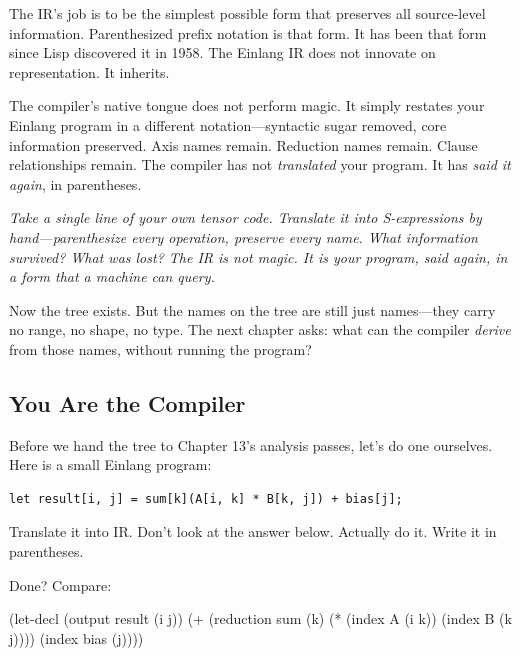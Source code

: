 \documentclass[11pt,titlepage]{article}
\newenvironment{Shaded}{}{}
\newcommand{\NormalTok}[1]{#1}
\newcommand{\OperatorTok}[1]{\textcolor[rgb]{0.40,0.40,0.40}{#1}}
\begin{document}
The IR's job is to be the simplest possible form that preserves all
source-level information. Parenthesized prefix notation is that form. It
has been that form since Lisp discovered it in 1958. The Einlang IR does
not innovate on representation. It inherits.

\vspace{2em}

The compiler's native tongue does not perform magic. It simply restates
your Einlang program in a different notation---syntactic sugar removed,
core information preserved. Axis names remain. Reduction names remain.
Clause relationships remain. The compiler has not \emph{translated} your
program. It has \emph{said it again}, in parentheses.

\vspace{2em}

\emph{Take a single line of your own tensor code. Translate it into
S-expressions by hand---parenthesize every operation, preserve every
name. What information survived? What was lost? The IR is not magic. It
is your program, said again, in a form that a machine can query.}

Now the tree exists. But the names on the tree are still just
names---they carry no range, no shape, no type. The next chapter asks:
what can the compiler \emph{derive} from those names, without running
the program?

\vspace{2em}

\hypertarget{you-are-the-compiler}{%
\subsection{You Are the Compiler}\label{you-are-the-compiler}}

Before we hand the tree to Chapter 13's analysis passes, let's do one
ourselves. Here is a small Einlang program:

\begin{verbatim}
let result[i, j] = sum[k](A[i, k] * B[k, j]) + bias[j];
\end{verbatim}

Translate it into IR. Don't look at the answer below. Actually do it.
Write it in parentheses.

\vspace{2em}

Done? Compare:

\begin{Shaded}
\begin{Highlighting}[]
\NormalTok{(let-decl (output result (i j))}
\NormalTok{  (}\OperatorTok{+}\NormalTok{ (reduction sum (k)}
\NormalTok{       (}\OperatorTok{*}\NormalTok{ (index A (i k)) (index B (k j))))}
\NormalTok{     (index bias (j))))}
\end{Highlighting}
\end{Shaded}
\end{document}
